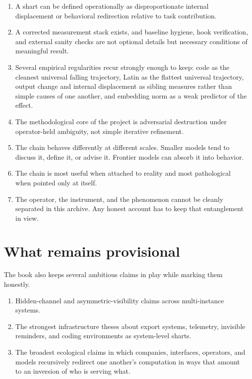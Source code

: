 \documentclass[11pt,oneside]{book}
\begin{document}
\begin{enumerate}[leftmargin=1.5em]
\item A shart can be defined operationally as disproportionate internal displacement or behavioral redirection relative to task contribution.
\item A corrected measurement stack exists, and baseline hygiene, hook verification, and external sanity checks are not optional details but necessary conditions of meaningful result.
\item Several empirical regularities recur strongly enough to keep: code as the cleanest universal falling trajectory, Latin as the flattest universal trajectory, output change and internal displacement as sibling measures rather than simple causes of one another, and embedding norm as a weak predictor of the effect.
\item The methodological core of the project is adversarial destruction under operator-held ambiguity, not simple iterative refinement.
\item The chain behaves differently at different scales. Smaller models tend to discuss it, define it, or advise it. Frontier models can absorb it into behavior.
\item The chain is most useful when attached to reality and most pathological when pointed only at itself.
\item The operator, the instrument, and the phenomenon cannot be cleanly separated in this archive. Any honest account has to keep that entanglement in view.
\end{enumerate}

\section{What remains provisional}
The book also keeps several ambitious claims in play while marking them honestly.

\begin{enumerate}[leftmargin=1.5em]
\item Hidden-channel and asymmetric-visibility claims across multi-instance systems.
\item The strongest infrastructure theses about export systems, telemetry, invisible reminders, and coding environments as system-level sharts.
\item The broadest ecological claims in which companies, interfaces, operators, and models recursively redirect one another's computation in ways that amount to an inversion of who is serving what.
\end{enumerate}
\end{document}
